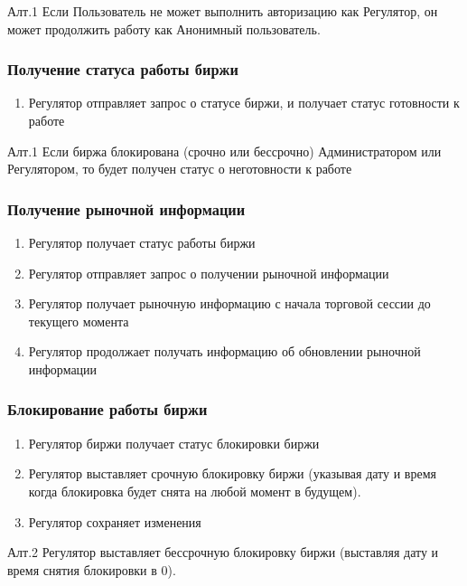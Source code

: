 \documentclass[a4paper, 12pt]{article}        %
\begin{document}
Алт.1 Если Пользователь не может выполнить авторизацию как Регулятор, он может продолжить работу как Анонимный пользователь.

\subsubsection{Получение статуса работы биржи}

\begin{enumerate}
\item Регулятор отправляет запрос о статусе биржи, и получает статус готовности к работе
\end{enumerate}

Алт.1 Если биржа блокирована (срочно или бессрочно) Администратором или Регулятором, то будет получен статус о неготовности к работе

\subsubsection{Получение рыночной информации}

\begin{enumerate}
\item Регулятор получает статус работы биржи
\item Регулятор отправляет запрос о получении рыночной информации
\item Регулятор получает рыночную информацию с начала торговой сессии до текущего момента
\item Регулятор продолжает получать информацию об обновлении рыночной информации
\end{enumerate}

\subsubsection{Блокирование работы биржи}

\begin{enumerate}
\item Регулятор биржи получает статус блокировки биржи
\item Регулятор выставляет срочную блокировку биржи (указывая дату и время когда блокировка будет снята на любой момент в будущем).
\item Регулятор сохраняет изменения
\end{enumerate}

Алт.2 Регулятор выставляет бессрочную блокировку биржи (выставляя дату и время снятия блокировки в 0).
\end{document}
